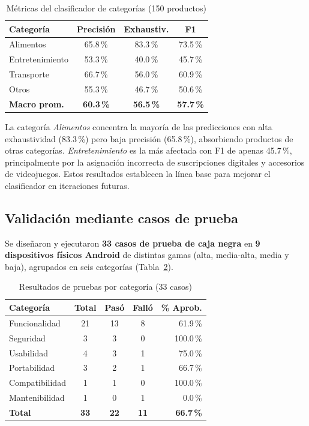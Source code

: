\documentclass[10pt,twocolumn,letterpaper]{article}
\begin{document}
\begin{table}[H]
  \centering
  \small
  \caption{Métricas del clasificador de categorías (150 productos)}
  \label{tab:metricas}
  \begin{tabular}{lccc}
    \toprule
    \textbf{Categoría} & \textbf{Precisión} & \textbf{Exhaustiv.} & \textbf{F1} \\
    \midrule
    Alimentos       & 65.8\,\% & 83.3\,\% & 73.5\,\% \\
    Entretenimiento & 53.3\,\% & 40.0\,\% & 45.7\,\% \\
    Transporte      & 66.7\,\% & 56.0\,\% & 60.9\,\% \\
    Otros           & 55.3\,\% & 46.7\,\% & 50.6\,\% \\
    \midrule
    \textbf{Macro prom.} & \textbf{60.3\,\%} & \textbf{56.5\,\%} & \textbf{57.7\,\%} \\
    \bottomrule
  \end{tabular}
\end{table}

La categoría \textit{Alimentos} concentra la mayoría de las predicciones con alta exhaustividad
(83.3\,\%) pero baja precisión (65.8\,\%), absorbiendo productos de otras categorías. \textit{Entretenimiento}
es la más afectada con F1 de apenas 45.7\,\%, principalmente por la asignación incorrecta de
suscripciones digitales y accesorios de videojuegos. Estos resultados establecen la línea base
para mejorar el clasificador en iteraciones futuras.

\subsection{Validación mediante casos de prueba}

Se diseñaron y ejecutaron \textbf{33 casos de prueba de caja negra} en \textbf{9 dispositivos
físicos Android} de distintas gamas (alta, media-alta, media y baja), agrupados en seis
categorías (Tabla~\ref{tab:pruebas}).

\begin{table}[H]
  \centering
  \small
  \caption{Resultados de pruebas por categoría (33 casos)}
  \label{tab:pruebas}
  \begin{tabular}{lcccr}
    \toprule
    \textbf{Categoría} & \textbf{Total} & \textbf{Pasó} & \textbf{Falló} & \textbf{\% Aprob.} \\
    \midrule
    Funcionalidad  & 21 & 13 &  8 & 61.9\,\% \\
    Seguridad      &  3 &  3 &  0 & 100.0\,\% \\
    Usabilidad     &  4 &  3 &  1 & 75.0\,\% \\
    Portabilidad   &  3 &  2 &  1 & 66.7\,\% \\
    Compatibilidad &  1 &  1 &  0 & 100.0\,\% \\
    Mantenibilidad &  1 &  0 &  1 &   0.0\,\% \\
    \midrule
    \textbf{Total} & \textbf{33} & \textbf{22} & \textbf{11} & \textbf{66.7\,\%} \\
    \bottomrule
  \end{tabular}
\end{table}
\end{document}
